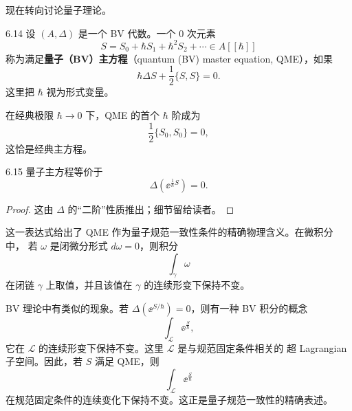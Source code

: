 现在转向讨论量子理论。

\begin{wdefn}{6.14}
  设 $(A,\Delta)$ 是一个 BV 代数。一个 0 次元素
  \[
    S = S_0 + \hbar S_1 + \hbar^2 S_2 + \cdots \in A[[\hbar]]
  \]
  称为满足\textbf{量子（BV）主方程}（quantum (BV) master equation, QME），如果
  \[
    \hbar\Delta S + \frac{1}{2}\{S,S\} = 0.
  \]
  这里把 $\hbar$ 视为形式变量。
\end{wdefn}

在经典极限 $\hbar\to 0$ 下，QME 的首个 $\hbar$ 阶成为
\[
  \frac{1}{2}\{S_0,S_0\} = 0,
\]
这恰是经典主方程。


\begin{wprop}{6.15}
  量子主方程等价于
  \[
    \Delta\left(\ee^{\frac{1}{\hbar}S}\right) = 0.
  \]
\end{wprop}

\begin{proof}
  这由 $\Delta$ 的“二阶”性质推出；细节留给读者。
\end{proof}


这一表达式给出了 QME 作为量子规范一致性条件的精确物理含义。在微积分中，
若 $\omega$ 是闭微分形式 $d\omega = 0$，则积分
\[
  \int_\gamma \omega
\]
在闭链 $\gamma$ 上取值，并且该值在 $\gamma$ 的连续形变下保持不变。

BV 理论中有类似的现象。若 $\Delta(\ee^{S/\hbar}) = 0$，则有一种 BV 积分的概念
\[
  \int_{\mathcal{L}} \ee^{\frac{S}{\hbar}},
\]
它在 $\mathcal{L}$ 的连续形变下保持不变。这里 $\mathcal{L}$ 是与规范固定条件相关的
超 Lagrangian 子空间。因此，若 $S$ 满足 QME，则
\[
  \int_{\mathcal{L}} \ee^{\frac{S}{\hbar}}
\]
在规范固定条件的连续变化下保持不变。这正是量子规范一致性的精确表述。


